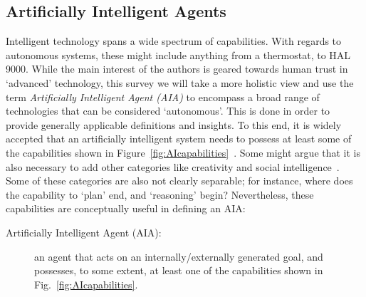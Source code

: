 \subsection{Artificially Intelligent Agents} \label{sec:aias}
    Intelligent technology spans a wide spectrum of capabilities. With regards to autonomous systems, these might include anything from a thermostat, to HAL 9000. While the main interest of the authors is geared towards human trust in `advanced' technology, this survey we will take a more holistic view and use the term \textit{Artificially Intelligent Agent (AIA)} to encompass a broad range of technologies that can be considered `autonomous'. This is done in order to provide generally applicable definitions and insights. 
%
To this end, it is widely accepted that an artificially intelligent system needs to possess at least some of the capabilities shown in Figure~\ref{fig:AIcapabilities}~\cite{Russell2010-wv,Nilsson2009-rp,Luger2008-vf}. Some might argue that it is also necessary to add other categories like creativity and social intelligence~\cite{Tao2005-kh}. 
Some of these categories are also not clearly separable; for instance, where does the capability to `plan' end, and `reasoning' begin? 
Nevertheless, these capabilities are conceptually useful in defining an AIA:     
    \begin{description}
        \item[Artificially Intelligent Agent (AIA):] an agent that acts on an internally/externally generated goal, and possesses, to some extent, at least one of the capabilities shown in Fig.~\ref{fig:AIcapabilities}.
    \end{description}

